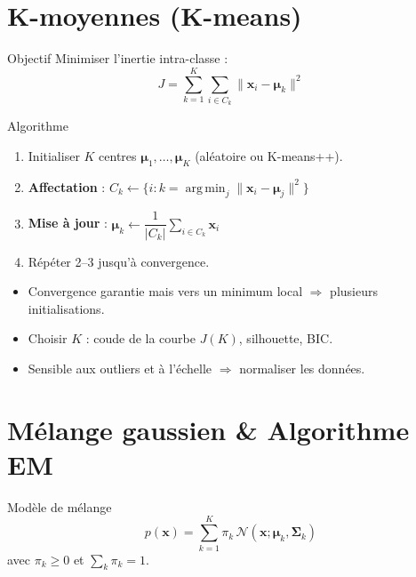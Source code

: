 \documentclass[10pt,a4paper,twocolumn]{article}
\newcommand{\argmin}{\operatorname*{arg\,min}}
\begin{document}
\section{K-moyennes (K-means)}

\begin{formulebox}{Objectif}
Minimiser l'inertie intra-classe :
\[
J = \sum_{k=1}^K \sum_{i \in C_k} \|\mathbf{x}_i - \bm{\mu}_k\|^2
\]
\end{formulebox}

\begin{defbox}{Algorithme}
\begin{enumerate}[leftmargin=*,itemsep=1pt]
  \item Initialiser $K$ centres $\bm{\mu}_1,\ldots,\bm{\mu}_K$ (aléatoire ou K-means++).
  \item \textbf{Affectation} : $C_k \leftarrow \{i : k = \argmin_j\|\mathbf{x}_i - \bm{\mu}_j\|^2\}$
  \item \textbf{Mise à jour} : $\bm{\mu}_k \leftarrow \dfrac{1}{|C_k|}\sum_{i\in C_k}\mathbf{x}_i$
  \item Répéter 2–3 jusqu'à convergence.
\end{enumerate}
\end{defbox}

\begin{itemize}[leftmargin=*,itemsep=1pt]
  \item Convergence garantie mais vers un minimum local $\Rightarrow$ plusieurs initialisations.
  \item Choisir $K$ : coude de la courbe $J(K)$, silhouette, BIC.
  \item Sensible aux outliers et à l'échelle $\Rightarrow$ normaliser les données.
\end{itemize}

\section{Mélange gaussien \& Algorithme EM}

\begin{formulebox}{Modèle de mélange}
\[
p(\mathbf{x}) = \sum_{k=1}^K \pi_k\,\mathcal{N}(\mathbf{x};\bm{\mu}_k,\bm{\Sigma}_k)
\]
avec $\pi_k \geq 0$ et $\sum_k \pi_k = 1$.
\end{formulebox}
\end{document}
